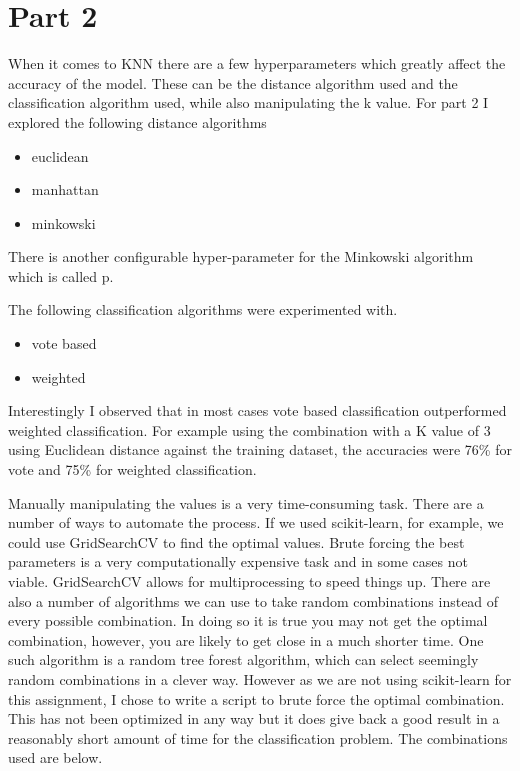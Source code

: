 \section{Part 2}

When it comes to KNN there are a few hyperparameters which greatly affect the accuracy of the model. These can be the distance algorithm used and the classification algorithm used, while also manipulating the k value. For part 2 I explored the following distance algorithms

\begin{itemize}
  \item euclidean
  \item manhattan
  \item minkowski
\end{itemize}

There is another configurable hyper-parameter for the Minkowski algorithm which is called p.

The following classification algorithms were experimented with.

\begin{itemize}
  \item vote based
  \item weighted
\end{itemize}

Interestingly I observed that in most cases vote based classification outperformed weighted classification. For example using the combination with a K value of 3 using Euclidean distance against the training dataset, the accuracies were 76\% for vote and 75\% for weighted classification.  

Manually manipulating the values is a very time-consuming task. There are a number of ways to automate the process. If we used scikit-learn, for example, we could use GridSearchCV to find the optimal values. Brute forcing the best parameters is a very computationally expensive task and in some cases not viable. GridSearchCV allows for multiprocessing to speed things up. There are also a number of algorithms we can use to take random combinations instead of every possible combination. In doing so it is true you may not get the optimal combination, however, you are likely to get close in a much shorter time. One such algorithm is a random tree forest algorithm, which can select seemingly random combinations in a clever way. 
However as we are not using scikit-learn for this assignment, I chose to write a script to brute force the optimal combination. This has not been optimized in any way but it does give back a good result in a reasonably short amount of time for the classification problem. The combinations used are below.


